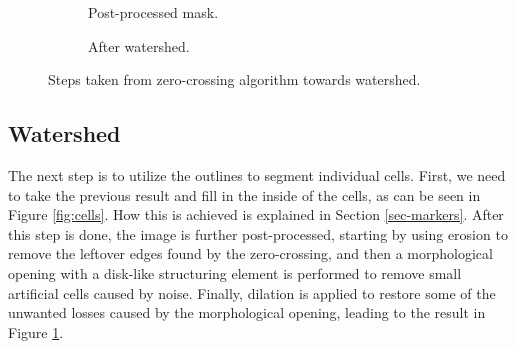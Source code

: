 \documentclass[
  digital,     %
  oneside,     %
  nosansbold,  %
  nocolorbold, %
  lof,         %
  lot,         %
]{fithesis4}
\begin{document}
\begin{figure}
\begin{subfigure}[t]{0.45\textwidth}
        \caption{Post-processed mask.}
        \label{fig:cells-post-processed}
    \end{subfigure}
    \begin{subfigure}[t]{0.45\textwidth}
        \caption{After watershed.}
        \label{fig:watershed}
    \end{subfigure}
    \caption{Steps taken from zero-crossing algorithm towards watershed.}
    \label{fig:zc-watershed}
\end{figure}

\subsection{Watershed}
The next step is to utilize the outlines to segment individual cells. First, we need
to take the previous result and fill in the inside of the cells, as can be seen
in Figure \ref{fig:cells}. How this is achieved is explained in Section
\ref{sec-markers}. After this step is done, the image is further post-processed,
starting by using erosion to remove the leftover edges found by the zero-crossing, and then a morphological opening with
a disk-like structuring element is performed to remove small artificial cells caused
by noise. Finally, dilation is applied to restore some of the unwanted losses
caused by the morphological opening, leading to the result in Figure 
\ref{fig:cells-post-processed}.
\end{document}
